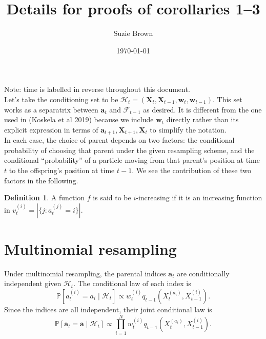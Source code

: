 \documentclass[fleqn]{article}
\title{Details for proofs of corollaries 1--3}
\author{Suzie Brown}
\date{\today}
\theoremstyle{definition}
\newtheorem{defn}{Definition}
\newcommand{\PR}{\mathbb{P}}
\newcommand{\1}[1]{\mathbbm{1}_{\{#1\}}}
\newcommand{\vt}[2][t]{v_{#1}^{(#2)}}
\newcommand{\wt}[2][t]{w_{#1}^{(#2)}}
\begin{document}
\maketitle
\thispagestyle{fancy}
Note: time is labelled in reverse throughout this document.\\

Let's take the conditioning set to be $\mathcal{H}_t = (\mathbf{X}_t, \mathbf{X}_{t-1}, \mathbf{w}_t, \mathbf{w}_{t-1})$. This set works as a separatrix between $\mathbf{a}_{t}$ and $\mathcal{F}_{t-1}$ as desired. It is different from the one used in (Koskela et al 2019) because we include $\mathbf{w}_t$ directly rather than its explicit expression in terms of $\mathbf{a}_{t+1}, \mathbf{X}_{t+1}, \mathbf{X}_t$ to simplify the notation.\\

In each case, the choice of parent depends on two factors: the conditional probability of choosing that parent under the given resampling scheme, and the conditional ``probability'' of a particle moving from that parent's position at time $t$ to the offspring's position at time $t-1$. We see the contribution of these two factors in the following.

\begin{defn}
A function $f$ is said to be $i$-increasing if it is an increasing function in $\vt{i} = |\{j : a_t^{(j)} = i \}|$.
\end{defn}

\section*{Multinomial resampling}

Under multinomial resampling, the parental indices $\mathbf{a}_t$ are conditionally independent given $\mathcal{H}_t$. The conditional law of each index is
\begin{equation*}
\PR [a_t^{(i)} = a_i \mid \mathcal{H}_t] \propto \wt{i} q_{t-1}(X_t^{(a_i)}, X_{t-1}^{(i)}).
\end{equation*}
Since the indices are all independent, their joint conditional law is
\begin{equation*}
\PR [\mathbf{a}_t = \mathbf{a} \mid \mathcal{H}_t] \propto \prod_{i=1}^N \wt{i} q_{t-1}(X_t^{(a_i)}, X_{t-1}^{(i)}).
\end{equation*}
\end{document}
